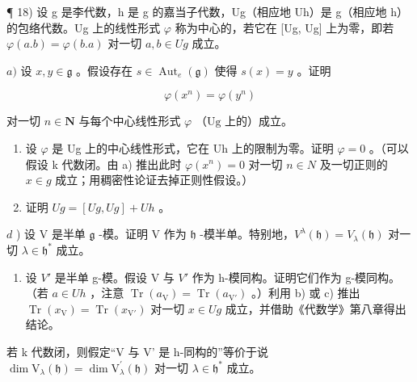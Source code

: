 ¶ 18) 设 g 是李代数，h 是 g 的嘉当子代数，Ug（相应地 Uh）是 g（相应地 h）的包络代数。Ug 上的线性形式 \(\varphi\) 称为中心的，若它在 {[}Ug, Ug{]} 上为零，即若 \(\varphi(a.b) = \varphi(b.a)\) 对一切 \(a, b \in Ug\) 成立。

\(a)\) 设 \(x, y \in \mathfrak{g}\) 。假设存在 \(s \in \operatorname{Aut}_e(\mathfrak{g})\) 使得 \(s(x) = y\) 。证明

\[
\varphi (x ^ {n}) = \varphi (y ^ {n})
\]

对一切 \(n \in \mathbf{N}\) 与每个中心线性形式 \(\varphi\) （\(\mathrm{Ug}\) 上的）成立。

\begin{enumerate}
\def\labelenumi{\alph{enumi})}
\setcounter{enumi}{1}
\item
  设 \(\varphi\) 是 Ug 上的中心线性形式，它在 Uh 上的限制为零。证明 \(\varphi = 0\) 。（可以假设 k 代数闭。由 a) 推出此时 \(\varphi(x^{n}) = 0\) 对一切 \(n \in N\) 及一切正则的 \(x \in g\) 成立；用稠密性论证去掉正则性假设。）
\item
  证明 \(Ug = [Ug, Ug] + Uh\) 。
\end{enumerate}

\(d\) ) 设 V 是半单 \(\mathfrak{g}\) -模。证明 V 作为 \(\mathfrak{h}\) -模半单。特别地，\(V^{\lambda}(\mathfrak{h}) = V_{\lambda}(\mathfrak{h})\) 对一切 \(\lambda \in \mathfrak{h}^{*}\) 成立。

\begin{enumerate}
\def\labelenumi{\alph{enumi})}
\setcounter{enumi}{4}
\tightlist
\item
  设 \(V'\) 是半单 g-模。假设 V 与 \(V'\) 作为 h-模同构。证明它们作为 g-模同构。（若 \(a \in Uh\) ，注意 \(\operatorname{Tr}(a_{\mathrm{V}}) = \operatorname{Tr}(a_{\mathrm{V}'})\) 。）利用 b) 或 c) 推出 \(\operatorname{Tr}(x_{\mathrm{V}}) = \operatorname{Tr}(x_{\mathrm{V}'})\) 对一切 \(x \in Ug\) 成立，并借助《代数学》第八章得出结论。
\end{enumerate}

若 k 代数闭，则假定“V 与 V' 是 h-同构的”等价于说 \(\dim\mathrm{V}_{\lambda}(\mathfrak{h})=\dim\mathrm{V}_{\lambda}^{\prime}(\mathfrak{h})\) 对一切 \(\lambda\in\mathfrak{h}^{*}\) 成立。

